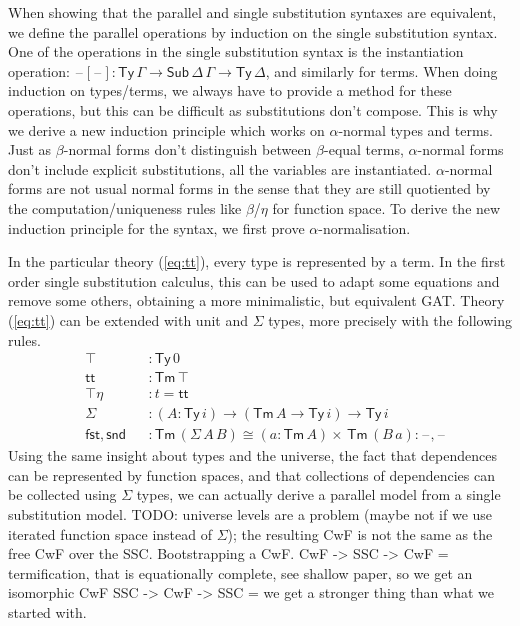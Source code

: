 \documentclass[sigplan,10pt,anonymous,review]{acmart}\settopmatter{printfolios=true,printccs=false,printacmref=false}
\newcommand{\ra}{\rightarrow}
\newcommand{\Ty}{\mathsf{Ty}}
\newcommand{\Tm}{\mathsf{Tm}}
\newcommand{\Sub}{\mathsf{Sub}}
\newcommand{\blank}{\mathord{\hspace{1pt}\text{--}\hspace{1pt}}} %
\renewcommand{\tt}{\mathsf{tt}}
\newcommand{\fst}{\mathsf{fst}}
\newcommand{\snd}{\mathsf{snd}}
\begin{document}
When showing that the parallel and single substitution syntaxes are
equivalent, we define the parallel operations by induction on the
single substitution syntax. One of the operations in the single
substitution syntax is the instantiation operation: $\blank[\blank] :
\Ty\,\Gamma\ra\Sub\,\Delta\,\Gamma\ra\Ty\,\Delta$, and similarly for
terms. When doing induction on types/terms, we always have to provide
a method for these operations, but this can be difficult as
substitutions don't compose. This is why we derive a new induction
principle which works on $\alpha$-normal types and terms. Just as
$\beta$-normal forms don't distinguish between $\beta$-equal terms,
$\alpha$-normal forms don't include explicit substitutions, all the
variables are instantiated. $\alpha$-normal forms are not usual normal
forms in the sense that they are still quotiented by the
computation/uniqueness rules like $\beta$/$\eta$ for function
space. To derive the new induction principle for the syntax, we first
prove $\alpha$-normalisation.

In the particular theory (\ref{eq:tt}), every type is represented by a
term. In the first order single substitution calculus, this can be
used to adapt some equations and remove some others, obtaining a more
minimalistic, but equivalent GAT. Theory (\ref{eq:tt}) can be extended
with unit and $\Sigma$ types, more precisely with the following rules.
\begin{equation}\label{eq:sigma}
  \begin{alignedat}{10}
    & \top && : \Ty\,0 \\
    & \tt && : \Tm\,\top \\
    & \top\eta && : t = \tt \\
    & \Sigma && : (A:\Ty\,i)\ra(\Tm\,A\ra\Ty\,i)\ra\Ty\,i \\
    & \fst,\snd && : \Tm\,(\Sigma\,A\,B)\cong(a:\Tm\,A)\times\,\Tm\,(B\,a): \blank,\blank
\end{alignedat}
\end{equation}
Using the same insight about types and the universe, the fact that
dependences can be represented by function spaces, and that
collections of dependencies can be collected using $\Sigma$ types, we
can actually derive a parallel model from a single substitution model.
TODO: universe levels are a problem (maybe not if we use iterated
function space instead of $\Sigma$); the resulting CwF is not the same as
the free CwF over the SSC. Bootstrapping a CwF.
CwF -> SSC -> CwF = termification, that is equationally complete, see shallow paper, so we get an isomorphic CwF
SSC -> CwF -> SSC = we get a stronger thing than what we started with.
\end{document}
